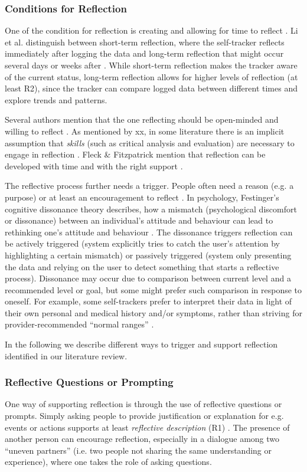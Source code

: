 \subsubsection{Conditions for Reflection}

One of the condition for reflection is creating and allowing for time to reflect \cite{Fleck}. Li et al. distinguish between short-term reflection, where the self-tracker reflects immediately after logging the data and long-term reflection that might occur several days or weeks after \cite{Li2010}. While short-term reflection makes the tracker aware of the current status, long-term reflection allows for higher levels of reflection (at least R2), since the tracker can compare logged data between different times and explore trends and patterns. 

Several authors mention that the one reflecting should be open-minded and willing to reflect \cite{insertTwoStudiesHere}. As mentioned by xx, in some literature there is an implicit assumption that \textit{skills} (such as critical analysis and evaluation) are necessary to engage in reflection \cite{insertTwoStudiesHere, Rogers}. Fleck \& Fitzpatrick mention that reflection can be developed with time and with the right support \cite{Fleck}. 

The reflective process further needs a trigger. People often need a reason (e.g. a purpose) or at least an encouragement to reflect \cite{Fleck, Mols}. In psychology, Festinger’s cognitive dissonance theory describes, how a mismatch (psychological discomfort or dissonance) between an individual's attitude and behaviour can lead to rethinking one’s attitude and behaviour \cite{Rivera}. The dissonance triggers reflection can be actively triggered (system explicitly tries to catch the user’s attention by highlighting a certain mismatch) or passively triggered (system only presenting the data and relying on the user to detect something that starts a reflective process). Dissonance may occur due to comparison between current level and a recommended level or goal, but some might prefer such comparison in response to oneself. For example, some self-trackers prefer to interpret their data in light of their own personal and medical history and/or symptoms, rather than striving for provider-recommended “normal ranges” \cite{Ancker2015}. 

In the following we describe different ways to trigger and support reflection identified in our literature review. 


\subsubsection{Reflective Questions or Prompting}
One way of supporting reflection is through the use of reflective questions or prompts. Simply asking people to provide justification or explanation for e.g. events or actions supports at least \textit{reflective description} (R1) \cite{Fleck}. The presence of another person can encourage reflection, especially in a dialogue among two “uneven partners” (i.e. two people not sharing the same understanding or experience), where one takes the role of asking questions. 

